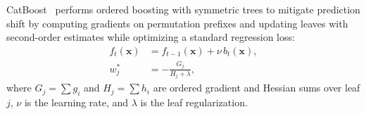 \acf{CatBoost}~\cite{catboost} performs ordered boosting with symmetric trees to mitigate prediction shift by computing gradients on permutation prefixes and updating leaves with second-order estimates while optimizing a standard regression loss:
\begin{align}
f_t(\mathbf{x}) &= f_{t-1}(\mathbf{x}) + \nu\, b_t(\mathbf{x}), \\
w_j^{*} &= -\frac{G_j}{H_j+\lambda},
\end{align}
where $G_j=\sum g_i$ and $H_j=\sum h_i$ are ordered gradient and Hessian sums over leaf $j$, $\nu$ is the learning rate, and $\lambda$ is the leaf regularization.
